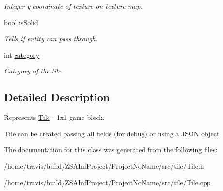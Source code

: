 \begin{DoxyCompactItemize}
\begin{DoxyCompactList}\small\item\em Integer y coordinate of texture on texture map. \end{DoxyCompactList}\item 
\hypertarget{classTile_a3a32e61b42ec4bc8bb1d924261c19403}{bool \hyperlink{classTile_a3a32e61b42ec4bc8bb1d924261c19403}{is\-Solid}}\label{classTile_a3a32e61b42ec4bc8bb1d924261c19403}

\begin{DoxyCompactList}\small\item\em Tells if entity can pass through. \end{DoxyCompactList}\item 
\hypertarget{classTile_ae2d870936fb8ae7df7fdd74f4cb27035}{int \hyperlink{classTile_ae2d870936fb8ae7df7fdd74f4cb27035}{category}}\label{classTile_ae2d870936fb8ae7df7fdd74f4cb27035}

\begin{DoxyCompactList}\small\item\em Category of the tile. \end{DoxyCompactList}\end{DoxyCompactItemize}


\subsection{Detailed Description}
Represents \hyperlink{classTile}{Tile} -\/ 1x1 game block. 

\hyperlink{classTile}{Tile} can be created passing all fields (for debug) or using a J\-S\-O\-N object 

The documentation for this class was generated from the following files\-:\begin{DoxyCompactItemize}
\item 
/home/travis/build/\-Z\-S\-A\-Inf\-Project/\-Project\-No\-Name/src/tile/Tile.\-h\item 
/home/travis/build/\-Z\-S\-A\-Inf\-Project/\-Project\-No\-Name/src/tile/Tile.\-cpp\end{DoxyCompactItemize}
